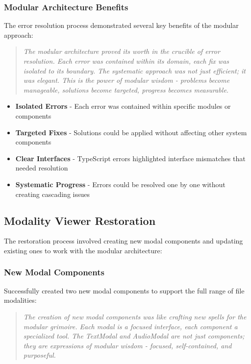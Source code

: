 \documentclass[11pt]{article}
\begin{document}
\subsubsection{Modular Architecture Benefits}

The error resolution process demonstrated several key benefits of the modular approach:

\begin{quote}
\emph{The modular architecture proved its worth in the crucible of error resolution. Each error was contained within its domain, each fix was isolated to its boundary. The systematic approach was not just efficient; it was elegant. This is the power of modular wisdom - problems become manageable, solutions become targeted, progress becomes measurable.}
\end{quote}

\begin{itemize}
\item \textbf{Isolated Errors} - Each error was contained within specific modules or components
\item \textbf{Targeted Fixes} - Solutions could be applied without affecting other system components
\item \textbf{Clear Interfaces} - TypeScript errors highlighted interface mismatches that needed resolution
\item \textbf{Systematic Progress} - Errors could be resolved one by one without creating cascading issues
\end{itemize}

\subsection{Modality Viewer Restoration}

The restoration process involved creating new modal components and updating existing ones to work with the modular architecture:

\subsubsection{New Modal Components}

Successfully created two new modal components to support the full range of file modalities:

\begin{quote}
\emph{The creation of new modal components was like crafting new spells for the modular grimoire. Each modal is a focused interface, each component a specialized tool. The TextModal and AudioModal are not just components; they are expressions of modular wisdom - focused, self-contained, and purposeful.}
\end{quote}
\end{document}
